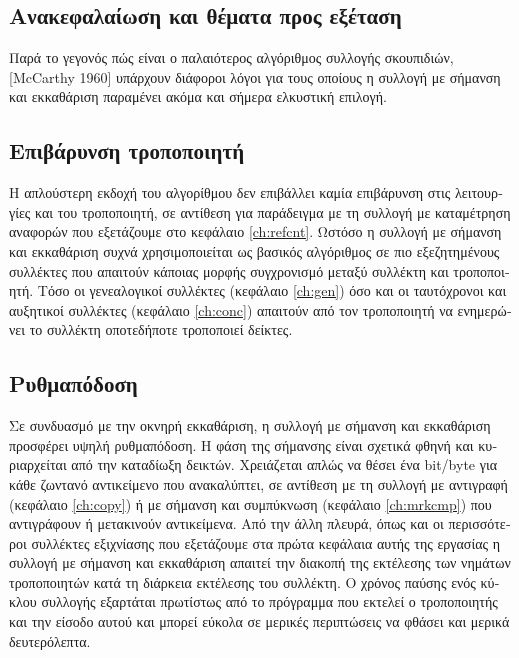 \begin{greek}
\section{Ανακεφαλαίωση και θέματα προς εξέταση}
Παρά το γεγονός πώς είναι ο παλαιότερος αλγόριθμος συλλογής
σκουπιδιών, [McCarthy 1960] υπάρχουν διάφοροι λόγοι για τους 
οποίους η συλλογή με σήμανση και εκκαθάριση παραμένει ακόμα και
σήμερα ελκυστική επιλογή.

\subsection{Επιβάρυνση τροποποιητή}
Η απλούστερη εκδοχή του αλγορίθμου δεν επιβάλλει καμία επιβάρυνση
στις λειτουργίες  και  του 
τροποποιητή, σε αντίθεση για παράδειγμα με τη συλλογή με καταμέτρηση
αναφορών που εξετάζουμε στο κεφάλαιο \ref{ch:refcnt}.
Ωστόσο η συλλογή με σήμανση και εκκαθάριση συχνά χρησιμοποιείται
ως βασικός αλγόριθμος σε πιο εξεζητημένους συλλέκτες που απαιτούν
κάποιας μορφής συγχρονισμό μεταξύ συλλέκτη και τροποποιητή. Τόσο
οι γενεαλογικοί συλλέκτες (κεφάλαιο \ref{ch:gen}) όσο και
οι ταυτόχρονοι και αυξητικοί συλλέκτες (κεφάλαιο \ref{ch:conc})
απαιτούν από τον τροποποιητή να ενημερώνει το συλλέκτη οποτεδήποτε
τροποποιεί δείκτες.

\subsection{Ρυθμαπόδοση}
Σε συνδυασμό με την οκνηρή εκκαθάριση, η συλλογή με σήμανση και
εκκαθάριση προσφέρει υψηλή ρυθμαπόδοση. Η φάση της σήμανσης είναι
σχετικά φθηνή και κυριαρχείται από την καταδίωξη δεικτών. Χρειάζεται
απλώς να θέσει ένα bit/byte για κάθε ζωντανό αντικείμενο που
ανακαλύπτει, σε αντίθεση με τη συλλογή με αντιγραφή (κεφάλαιο
\ref{ch:copy}) ή με σήμανση και συμπύκνωση (κεφάλαιο \ref{ch:mrkcmp}) 
που αντιγράφουν ή μετακινούν αντικείμενα. Από την άλλη πλευρά, 
όπως και οι περισσότεροι συλλέκτες εξιχνίασης που εξετάζουμε
στα πρώτα κεφάλαια αυτής της εργασίας η συλλογή με σήμανση και
εκκαθάριση απαιτεί την διακοπή της εκτέλεσης των νημάτων τροποποιητών
κατά τη διάρκεια εκτέλεσης του συλλέκτη. Ο χρόνος παύσης ενός
κύκλου συλλογής εξαρτάται πρωτίστως από το πρόγραμμα που εκτελεί
ο τροποποιητής και την είσοδο αυτού και μπορεί εύκολα σε μερικές
περιπτώσεις να φθάσει και μερικά δευτερόλεπτα.


\end{greek}
